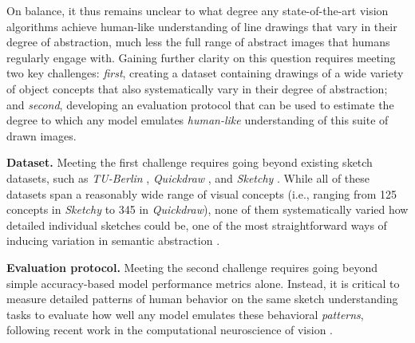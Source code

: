 \documentclass{article}
\begin{document}
On balance, it thus remains unclear to what degree any state-of-the-art vision algorithms achieve human-like understanding of line drawings that vary in their degree of abstraction, much less the full range of abstract images that humans regularly engage with. 
Gaining further clarity on this question requires meeting two key challenges: \textit{first}, creating a dataset containing drawings of a wide variety of object concepts that also systematically vary in their degree of abstraction; and \textit{second}, developing an evaluation protocol that can be used to estimate the degree to which any model emulates \textit{human-like} understanding of this suite of drawn images.



\textbf{Dataset.} Meeting the first challenge requires going beyond existing sketch datasets, such as \textit{TU-Berlin} \cite{eitz2012sketch}, \textit{Quickdraw} \cite{jongejan2017quick}, and \textit{Sketchy} \cite{sangkloy2016sketchy}. 
While all of these datasets span a reasonably wide range of visual concepts (i.e., ranging from 125 concepts in \textit{Sketchy} to 345 in \textit{Quickdraw}), none of them systematically varied how detailed individual sketches could be, one of the most straightforward ways of inducing variation in semantic abstraction \cite{berger2013style, fan2020pragmatic, yang2021visual}. 

\textbf{Evaluation protocol.} 
Meeting the second challenge requires going beyond simple accuracy-based model performance metrics alone.
Instead, it is critical to measure detailed patterns of human behavior on the same sketch understanding tasks to evaluate how well any model emulates these behavioral \textit{patterns}, following recent work in the computational neuroscience of vision \cite{rajalingham2018large, bear2021physion}.

\end{document}
